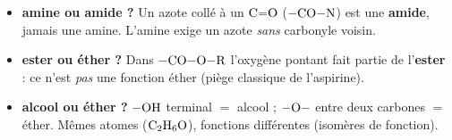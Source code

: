 \documentclass[11pt,a4paper]{article}
\begin{document}
\begin{piege}
\begin{itemize}[leftmargin=1.6em,itemsep=0.5pt]
  \item \textbf{amine ou amide ?} Un azote collé à un $\ce{C=O}$ ($-\ce{CO-N}$) est une \textbf{amide}, jamais une amine. L'amine exige un azote \emph{sans} carbonyle voisin.
  \item \textbf{ester ou éther ?} Dans $-\ce{CO-O-R}$ l'oxygène pontant fait partie de l'\textbf{ester} : ce n'est \emph{pas} une fonction éther (piège classique de l'aspirine).
  \item \textbf{alcool ou éther ?} $-\ce{OH}$ terminal $=$ alcool ; $-\ce{O}-$ entre deux carbones $=$ éther. Mêmes atomes ($\ce{C2H6O}$), fonctions différentes (isomères de fonction).
\end{itemize}
\end{piege}
\end{document}
